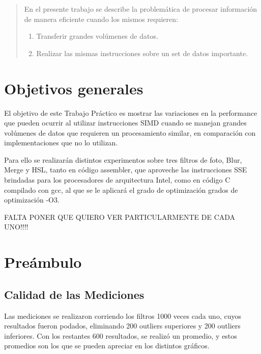 \documentclass[a4paper]{article}
\begin{document}
\thispagestyle{empty}

\maketitle
\newpage

\thispagestyle{empty}
\vfill
\begin{abstract}
En el presente trabajo se describe la problemática de procesar información de manera eficiente cuando los mismos requieren:
\begin{enumerate}
\item Transferir grandes volúmenes de datos.
\item Realizar las mismas instrucciones sobre un set de datos importante.
\end{enumerate}
\end{abstract}
\thispagestyle{empty}
\vspace{3cm}
\tableofcontents
\newpage

\section{Objetivos generales}
El objetivo de este Trabajo Práctico es mostrar las variaciones en la performance que pueden ocurrir al utilizar instrucciones SIMD cuando se manejan grandes volúmenes de datos que requieren un procesamiento similar, en comparación con implementaciones que no lo utilizan.

Para ello se realizarán distintos experimentos sobre tres filtros de foto, Blur, Merge y HSL, tanto en código assembler, que aproveche las instrucciones SSE brindadas para los procesadores de arquitectura Intel, como en código C compilado con gcc, al que se le aplicará el grado de optimización grados de optimización -O3.

FALTA PONER QUE QUIERO VER PARTICULARMENTE DE CADA UNO!!!!


\newpage
\section{Preámbulo}

\subsection{Calidad de las Mediciones}
Las mediciones se realizaron corriendo los filtros 1000 veces cada uno, cuyos resultados fueron podados, eliminando 200 outliers superiores y 200 outliers inferiores. Con los restantes 600 resultados, se realizó un promedio, y estos promedios son los que se pueden apreciar en los distintos gráficos.
\end{document}
